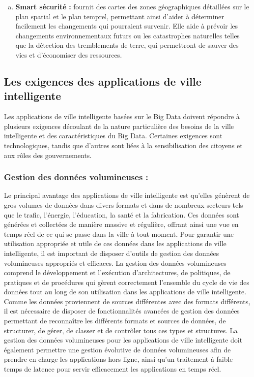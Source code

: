 \documentclass[french, a4paper, 12pt]{report}
\begin{document}
\begin{enumerate}[a.]
\item \textbf{Smart sécurité :} fournit des cartes des zones géographiques détaillées sur le plan spatial et le plan temprel, permettant ainsi d’aider à déterminer facilement les changements qui pourraient survenir.
Elle aide à prévoir les changements environnementaux futurs ou les catastrophes naturelles telles que la détection des tremblements de terre, qui permettront de sauver des vies et d'économiser des ressources.\\
\end{enumerate}

\subsection{Les exigences des applications de ville intelligente}
Les applications de ville intelligente basées sur le Big Data doivent répondre à plusieurs exigences découlant de la nature particulière des besoins de la ville intelligente et des caractéristiques du Big Data. Certaines exigences sont technologiques, tandis que d’autres sont liées à la sensibilisation des citoyens et aux rôles des gouvernements.\\
\subsubsection{Gestion des données volumineuses : }
Le principal avantage des applications de ville intelligente est qu’elles génèrent de gros volumes de données dans divers formats et dans de nombreux secteurs tels que le trafic, l’énergie, l’éducation, la santé et la fabrication. Ces données sont générées et collectées de manière massive et régulière, offrant ainsi une vue en temps réel de ce qui se passe dans la ville à tout moment. Pour garantir une utilisation appropriée et utile de ces données dans les applications de ville intelligente, il est important de disposer d'outils de gestion des données volumineuses appropriés et efficaces. La gestion des données volumineuses comprend le développement et l'exécution d'architectures, de politiques, de pratiques et de procédures qui gèrent correctement l'ensemble du cycle de vie des données tout au long de son utilisation dans les applications de ville intelligente. Comme les données proviennent de sources différentes avec des formats différents, il est nécessaire de disposer de fonctionnalités avancées de gestion des données permettant de reconnaître les différents formats et sources de données, de structurer, de gérer, de classer et de contrôler tous ces types et structures. La gestion des données volumineuses pour les applications de ville intelligente doit également permettre une gestion évolutive de données volumineuses afin de prendre en charge les applications hors ligne, ainsi qu'un traitement à faible temps de latence pour servir efficacement les applications en temps réel.\\
\end{document}
